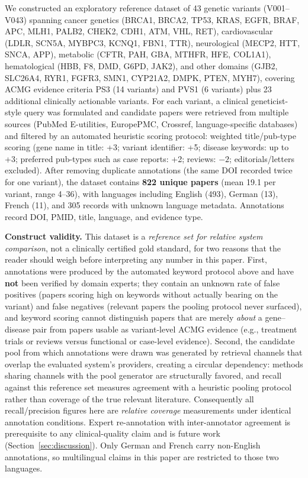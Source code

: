 \documentclass[sigconf,screen]{acmart}
\begin{document}
We constructed an exploratory reference dataset of 43 genetic variants
(V001--V043)
spanning cancer genetics (BRCA1, BRCA2, TP53, KRAS, EGFR, BRAF, APC, MLH1,
PALB2, CHEK2, CDH1, ATM, VHL, RET),
cardiovascular (LDLR, SCN5A, MYBPC3, KCNQ1, FBN1, TTR),
neurological (MECP2, HTT, SNCA, APP),
metabolic (CFTR, PAH, GBA, MTHFR, HFE, COL1A1),
hematological (HBB, F8, DMD, G6PD, JAK2),
and other domains (GJB2, SLC26A4, RYR1, FGFR3, SMN1, CYP21A2, DMPK, PTEN,
MYH7), covering ACMG evidence criteria PS3 (14 variants) and PVS1 (6
variants) plus 23 additional clinically actionable variants. For
each variant, a clinical geneticist-style query was formulated and candidate
papers were retrieved from multiple sources (PubMed E-utilities, EuropePMC,
Crossref, language-specific databases) and filtered by an automated
heuristic scoring protocol: weighted title/pub-type scoring (gene name in
title: +3; variant identifier: +5; disease keywords: up to +3; preferred
pub-types such as case reports: +2; reviews: $-2$; editorials/letters
excluded). After removing duplicate annotations (the same DOI recorded
twice for one variant), the dataset contains \textbf{822 unique papers}
(mean 19.1 per variant, range 4--36), with languages including English
(493), German (13), French (11), and 305 records with unknown language
metadata. Annotations record DOI, PMID, title, language, and evidence type.

\textbf{Construct validity.} This dataset is a \emph{reference set for
relative system comparison}, not a clinically certified gold standard, for
two reasons that the reader should weigh before interpreting any number in
this paper. First, annotations were produced by the automated keyword
protocol above and have \textbf{not} been verified by domain experts; they
contain an unknown rate of false positives (papers scoring high on keywords
without actually bearing on the variant) and false negatives (relevant
papers the pooling protocol never surfaced), and keyword scoring cannot
distinguish papers that are merely \emph{about} a gene--disease pair from
papers usable as variant-level ACMG evidence (e.g., treatment trials or
reviews versus functional or case-level evidence). Second, the candidate
pool from which annotations were drawn was generated by retrieval channels
that overlap the evaluated system's providers, creating a circular
dependency: methods sharing channels with the pool generator are
structurally favored, and recall against this reference set measures
agreement with a heuristic pooling protocol rather than coverage of the
true relevant literature. Consequently all recall/precision figures here
are \emph{relative coverage} measurements under identical annotation
conditions. Expert re-annotation with inter-annotator agreement is
prerequisite to any clinical-quality claim and is future work
(Section~\ref{sec:discussion}). Only German and French carry non-English
annotations, so multilingual claims in this paper are restricted to those
two languages.
\end{document}
